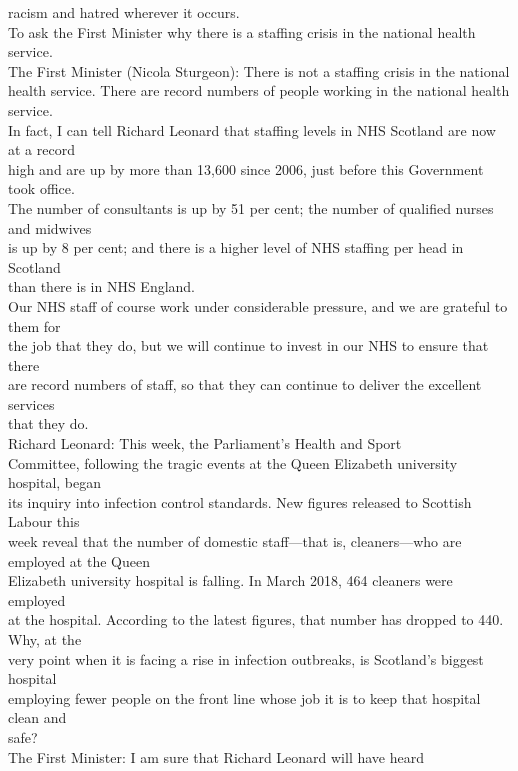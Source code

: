 \documentclass{article}
\begin{document}
\begin{description}
{racism and hatred wherever it occurs.\\
To ask the First Minister why there is a staffing crisis in the national health service.\\
The First Minister (Nicola Sturgeon): There is not a staffing crisis in the national\\
health service. There are record numbers of people working in the national health service.\\
In fact, I can tell Richard Leonard that staffing levels in NHS Scotland are now at a record\\
high and are up by more than 13,600 since 2006, just before this Government took office.\\
The number of consultants is up by 51 per cent; the number of qualified nurses and midwives\\
is up by 8 per cent; and there is a higher level of NHS staffing per head in Scotland\\
than there is in NHS England.\\
Our NHS staff of course work under considerable pressure, and we are grateful to them for\\
the job that they do, but we will continue to invest in our NHS to ensure that there\\
are record numbers of staff, so that they can continue to deliver the excellent services\\
that they do.\\
Richard Leonard: This week, the Parliament’s Health and Sport\\
Committee, following the tragic events at the Queen Elizabeth university hospital, began\\
its inquiry into infection control standards. New figures released to Scottish Labour this\\
week reveal that the number of domestic staff—that is, cleaners—who are employed at the Queen\\
Elizabeth university hospital is falling. In March 2018, 464 cleaners were employed\\
at the hospital. According to the latest figures, that number has dropped to 440. Why, at the\\
very point when it is facing a rise in infection outbreaks, is Scotland’s biggest hospital\\
employing fewer people on the front line whose job it is to keep that hospital clean and\\
safe?\\
The First Minister: I am sure that Richard Leonard will have heard\\
}
\end{description}
\end{document}
